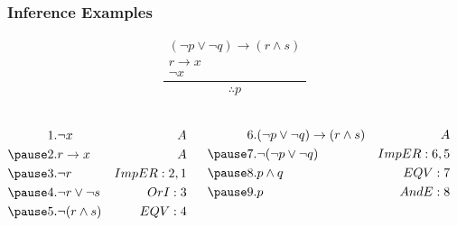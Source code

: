 \documentclass[dvipsnames]{beamer}
\begin{document}
\begin{frame}
  \frametitle{Inference Examples}

  \[
  \frac
    {
      \begin{array}{c}
        (\neg p \vee \neg q) \rightarrow (r \wedge s)\\
        r \rightarrow x\\
        \neg x
      \end{array}
    }
    {
      \therefore p
    }
  \]

  \pause
  \begin{columns}[t]
    \begin{eqnarray*}
      1. & \neg x                                        & A\\
      \pause
      2. & r \rightarrow x                               & A\\
      \pause
      3. & \neg r                                        & ImpER:2,1\\
      \pause
      4. & \neg r \vee \neg s                            & OrI:3\\
      \pause
      5. & \neg (r \wedge s)                             & EQV:4
    \end{eqnarray*}

    \pause
    \begin{eqnarray*}
      6. & (\neg p \vee \neg q) \rightarrow (r \wedge s) & A\\
      \pause
      7. & \neg (\neg p \vee \neg q)                     & ImpER:6,5\\
      \pause
      8. & p \wedge q                                    & EQV:7\\
      \pause
      9. & p                                             & AndE:8
    \end{eqnarray*}
  \end{columns}
\end{frame}
\end{document}
